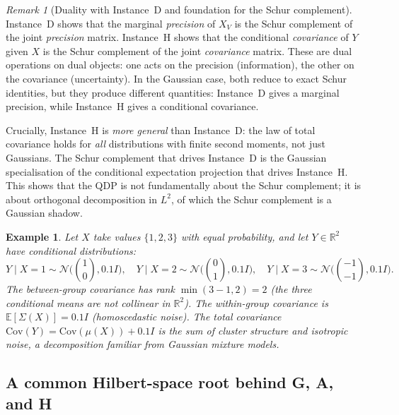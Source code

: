 \documentclass[11pt,a4paper]{article}
\numberwithin{equation}{section}
\newcommand{\R}{\mathbb{R}}
\theoremstyle{thmcompact}
\newtheorem{example}[theorem]{Example}
\theoremstyle{remark}
\newtheorem*{remarkplain}{Remark}
\newenvironment{remark}[1][]%
{\begin{remarkbox}\begin{remarkplain}[#1]\normalfont}
		{\end{remarkplain}\end{remarkbox}}
\begin{document}
\begin{remark}[Duality with Instance~D and foundation for the Schur complement]\label{rem:H-dual}
Instance~D shows that the marginal \emph{precision} of $X_V$ is the Schur complement of the joint \emph{precision} matrix. Instance~H shows that the conditional \emph{covariance} of $Y$ given $X$ is the Schur complement of the joint \emph{covariance} matrix. These are dual operations on dual objects: one acts on the precision (information), the other on the covariance (uncertainty). In the Gaussian case, both reduce to exact Schur identities, but they produce different quantities: Instance~D gives a marginal precision, while Instance~H gives a conditional covariance.

Crucially, Instance~H is \emph{more general} than Instance~D: the law of total covariance holds for \emph{all} distributions with finite second moments, not just Gaussians. The Schur complement that drives Instance~D is the Gaussian specialisation of the conditional expectation projection that drives Instance~H. This shows that the QDP is not fundamentally about the Schur complement; it is about orthogonal decomposition in $L^2$, of which the Schur complement is a Gaussian shadow.
\end{remark}

\begin{example}\label{ex:bridge-H-toy}
Let $X$ take values $\{1, 2, 3\}$ with equal probability, and let $Y \in \R^2$ have conditional distributions:
\[
Y \mid X{=}1 \sim \mathcal{N}\bigl(\binom{1}{0}, 0.1 I\bigr), \quad
Y \mid X{=}2 \sim \mathcal{N}\bigl(\binom{0}{1}, 0.1 I\bigr), \quad
Y \mid X{=}3 \sim \mathcal{N}\bigl(\binom{-1}{-1}, 0.1 I\bigr).
\]
The between-group covariance has rank $\min(3{-}1, 2) = 2$ (the three conditional means are not collinear in $\R^2$). The within-group covariance is $\mathbb{E}[\Sigma(X)] = 0.1 I$ (homoscedastic noise). The total covariance $\mathrm{Cov}(Y) = \mathrm{Cov}(\mu(X)) + 0.1 I$ is the sum of cluster structure and isotropic noise, a decomposition familiar from Gaussian mixture models.
\end{example}

\subsection{A common Hilbert-space root behind G, A, and H}
\end{document}
